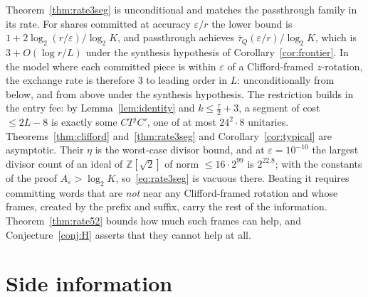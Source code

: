 \documentclass[aps,prx,twocolumn,superscriptaddress,nofootinbib,longbibliography]{revtex4-2}
\theoremstyle{plain}
\theoremstyle{definition}
\theoremstyle{remark}
\newcommand{\Z}{\mathbb{Z}}
\begin{document}
Theorem~\ref{thm:rate3seg} is unconditional and matches the passthrough family in its rate. For shares committed at accuracy $\varepsilon/r$ the lower bound is $1+2\log_2(r/\varepsilon)/\log_2K$, and passthrough achieves $\bar\tau_Q(\varepsilon/r)/\log_2K$, which is $3+O(\log r/L)$ under the synthesis hypothesis of Corollary~\ref{cor:frontier}. In the model where each committed piece is within $\varepsilon$ of a Clifford-framed $z$-rotation, the exchange rate is therefore $3$ to leading order in $L$: unconditionally from below, and from above under the synthesis hypothesis. The restriction builds in the entry fee: by Lemma~\ref{lem:identity} and $k\le\tfrac\tau2+3$, a segment of cost $\le2L-8$ is exactly some $CT^jC'$, one of at most $24^2\cdot8$ unitaries. Theorems~\ref{thm:clifford} and~\ref{thm:rate3seg} and Corollary~\ref{cor:typical} are asymptotic. Their $\eta$ is the worst-case divisor bound, and at $\varepsilon=10^{-10}$ the largest divisor count of an ideal of $\Z[\sqrt2]$ of norm $\le16\cdot2^{99}$ is $2^{22.8}$; with the constants of the proof $A_\varepsilon>\log_2K$, so~\eqref{eq:rate3seg} is vacuous there. Beating it requires committing words that are \emph{not} near any Clifford-framed rotation and whose frames, created by the prefix and suffix, carry the rest of the information. Theorem~\ref{thm:rate52} bounds how much such frames can help, and Conjecture~\ref{conj:H} asserts that they cannot help at all.

\section{Side information}\label{sec:side}
\end{document}
